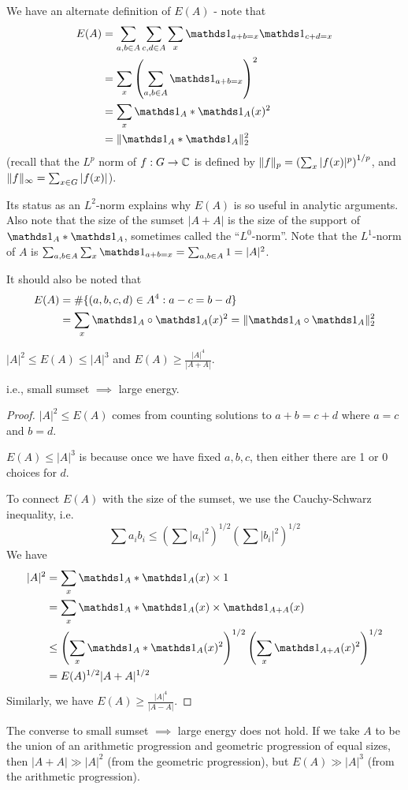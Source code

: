 \documentclass[10pt,a4paper]{article}
\begin{document}
We have an alternate definition of $E(A)$ - note that
\begin{align*}
  E(A) &= \sum_{a,b \in A} \sum_{c,d \in A} \sum_x \one_{a+b=x}\one_{c+d=x}\\
  &= \sum_x\left(\sum_{a,b\in A} \one_{a+b=x}\right)^2\\
  &= \sum_x \one_A \ast \one_A(x)^2\\
  &= \norm{\one_A \ast \one_A}_2^2
\end{align*}
(recall that the $L^p$ norm of $f:G \to \mathbb{C}$ is defined by $\lVert f\rVert_p = \left(\sum_x |f(x)|^p\right)^{1/p}$, and $\lVert f\rVert_\infty = \sum_{x\in G}|f(x)|$).

Its status as an $L^2$-norm explains why $E(A)$ is so useful in analytic arguments. Also note that the size of the sumset $|A+A|$ is the size of the support of $\one_A \ast \one_A$, sometimes called the ``$L^0$-norm''. Note that the $L^1$-norm of $A$ is $\sum_{a,b \in A}\sum_x \one_{a+b=x} = \sum_{a,b\in A} 1 = |A|^2$.

It should also be noted that
\begin{align*}
  E(A) &= \#\{(a,b,c,d) \in A^4 : a-c=b-d\}\\
  &= \sum_x \one_A \circ \one_A(x)^2 = \norm{\one_A\circ\one_A}_2^2
\end{align*}
\begin{lemma}
  $|A|^2 \leq E(A) \leq |A|^3$ and $E(A) \geq \frac{|A|^4}{|A+A|}$.
\end{lemma}
i.e., small sumset $\implies$ large energy.
\begin{proof}
  $|A|^2 \leq E(A)$ comes from counting solutions to $a+b=c+d$ where $a=c$ and $b=d$.

  $E(A)\leq |A|^3$ is because once we have fixed $a,b,c$, then either there are 1 or 0 choices for $d$.

  To connect $E(A)$ with the size of the sumset, we use the Cauchy-Schwarz inequality, i.e.
  \[\sum a_ib_i \leq \left(\sum|a_i|^2\right)^{1/2}\left(\sum |b_i|^2\right)^{1/2}\]
  We have
  \begin{align*}
    |A|^2 &= \sum_x \one_A\ast \one_A(x) \times 1\\
    &= \sum_x \one_A\ast \one_A(x) \times \one_{A+A}(x)\\
    &\leq \left(\sum_x \one_A \ast \one_A(x)^2\right)^{1/2}\left(\sum_x\one_{A+A}(x)^2\right)^{1/2}\\
    &= E(A)^{1/2}|A+A|^{1/2}
  \end{align*}
  Similarly, we have $E(A) \geq \frac{|A|^4}{|A-A|}$.
\end{proof}
The converse to small sumset $\implies$ large energy does not hold. If we take $A$ to be the union of an arithmetic progression and geometric progression of equal sizes, then $|A+A| \gg |A|^2$ (from the geometric progression), but $E(A) \gg |A|^3$ (from the arithmetic progression).
\end{document}
